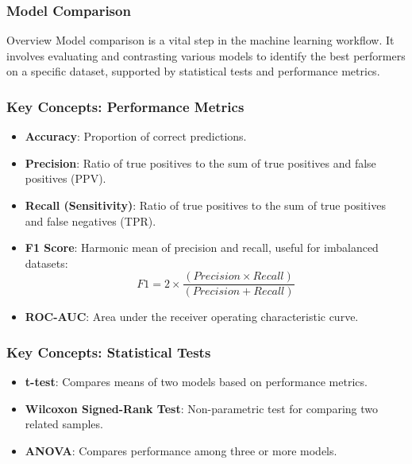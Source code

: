 \documentclass[aspectratio=169]{beamer}
\begin{document}
\begin{frame}
    \frametitle{Model Comparison}
    \begin{block}{Overview}
        Model comparison is a vital step in the machine learning workflow. It involves evaluating and contrasting various models to identify the best performers on a specific dataset, supported by statistical tests and performance metrics.
    \end{block}
\end{frame}

\begin{frame}
    \frametitle{Key Concepts: Performance Metrics}
    \begin{itemize}
        \item \textbf{Accuracy}: Proportion of correct predictions.
        \item \textbf{Precision}: Ratio of true positives to the sum of true positives and false positives (PPV).
        \item \textbf{Recall (Sensitivity)}: Ratio of true positives to the sum of true positives and false negatives (TPR).
        \item \textbf{F1 Score}: Harmonic mean of precision and recall, useful for imbalanced datasets:
        \begin{equation}
            F1 = 2 \times \frac{(Precision \times Recall)}{(Precision + Recall)}
        \end{equation}
        \item \textbf{ROC-AUC}: Area under the receiver operating characteristic curve.
    \end{itemize}
\end{frame}

\begin{frame}
    \frametitle{Key Concepts: Statistical Tests}
    \begin{itemize}
        \item \textbf{t-test}: Compares means of two models based on performance metrics.
        \item \textbf{Wilcoxon Signed-Rank Test}: Non-parametric test for comparing two related samples.
        \item \textbf{ANOVA}: Compares performance among three or more models.
    \end{itemize}
\end{frame}
\end{document}
